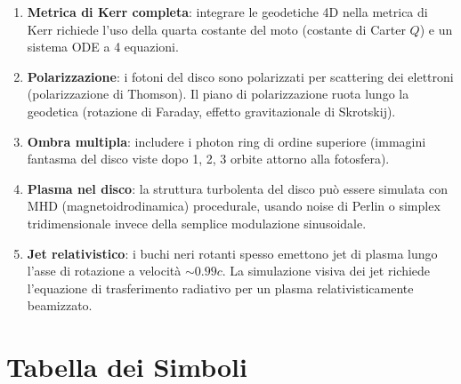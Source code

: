 \documentclass[12pt, a4paper, twoside]{article}
\theoremstyle{definition}
\begin{document}
\begin{enumerate}
  \item \textbf{Metrica di Kerr completa}: integrare le geodetiche 4D nella
    metrica di Kerr richiede l'uso della quarta costante del moto (costante
    di Carter $Q$) e un sistema ODE a 4 equazioni.

  \item \textbf{Polarizzazione}: i fotoni del disco sono polarizzati per
    scattering dei elettroni (polarizzazione di Thomson). Il piano di polarizzazione
    ruota lungo la geodetica (rotazione di Faraday, effetto gravitazionale di
    Skrotskij).

  \item \textbf{Ombra multipla}: includere i photon ring di ordine superiore
    (immagini fantasma del disco viste dopo 1, 2, 3 orbite attorno alla fotosfera).

  \item \textbf{Plasma nel disco}: la struttura turbolenta del disco può essere
    simulata con MHD (magnetoidrodinamica) procedurale, usando noise di Perlin
    o simplex tridimensionale invece della semplice modulazione sinusoidale.

  \item \textbf{Jet relativistico}: i buchi neri rotanti spesso emettono jet
    di plasma lungo l'asse di rotazione a velocità $\sim 0.99c$. La simulazione
    visiva dei jet richiede l'equazione di trasferimento radiativo per un plasma
    relativisticamente beamizzato.
\end{enumerate}

\appendix

\section{Tabella dei Simboli}
\end{document}
